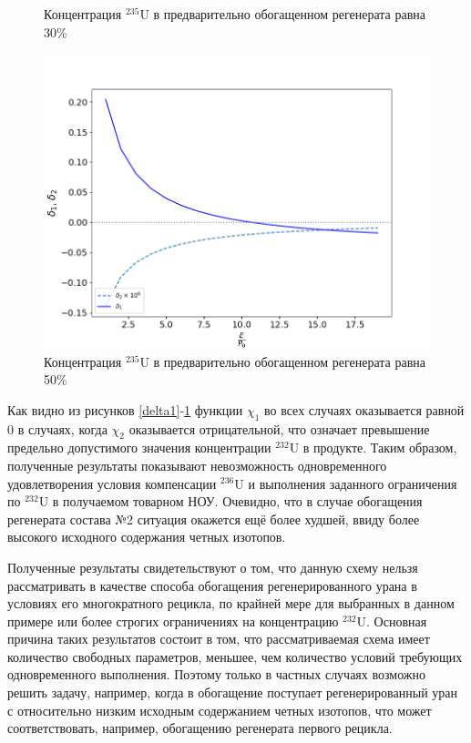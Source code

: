 \begin{figure}[ht]
\begin{minipage}{.5\textwidth}
    \caption{Концентрация $^{235}$U в предварительно обогащенном регенерата равна 30\%}
    \label{delta3}
  \end{minipage}
  \begin{minipage}{.5\textwidth}
    \centering
    \includegraphics[width=.8\linewidth]{images/plots/50}  
    \caption{Концентрация $^{235}$U в предварительно обогащенном регенерата равна 50\%}
    \label{delta4}
  \end{minipage}
 \end{figure}

Как видно из рисунков \ref{delta1}-\ref{delta4} функции $\chi_1$ во всех случаях оказывается равной 0 в случаях, когда $\chi_2$ оказывается отрицательной, что означает превышение предельно допустимого значения концентрации $^{232}$U в продукте. Таким образом, полученные результаты показывают невозможность одновременного удовлетворения условия компенсации $^{236}$U и выполнения заданного ограничения по $^{232}$U в получаемом товарном НОУ. Очевидно, что в случае обогащения регенерата состава №2 ситуация окажется ещё более худшей, ввиду более высокого исходного содержания четных изотопов. 

Полученные результаты свидетельствуют о том, что данную схему нельзя рассматривать в качестве способа обогащения регенерированного урана в условиях его многократного рецикла, по крайней мере для выбранных в данном примере или более строгих ограничениях на концентрацию $^{232}$U. Основная причина таких результатов состоит в том, что рассматриваемая схема имеет количество свободных параметров, меньшее, чем количество условий требующих одновременного выполнения. Поэтому только в частных случаях возможно решить задачу, например, когда в обогащение поступает регенерированный уран с относительно низким исходным содержанием четных изотопов, что может соответствовать, например, обогащению регенерата первого рецикла.



